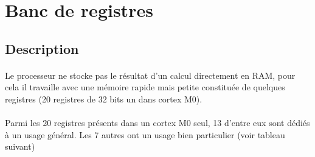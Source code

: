 \section{Banc de registres}

\subsection{Description}

	\paragraph{}
	Le processeur ne stocke pas le résultat d'un calcul directement en RAM, pour cela il travaille avec une mémoire rapide mais petite constituée de quelques registres (20 registres  de 32 bits un dans cortex M0).


	\paragraph{}
	Parmi les 20 registres présents dans un cortex M0 seul, 13 d'entre eux sont dédiés à un usage général. Les 7 autres ont un usage bien particulier (voir tableau suivant)

